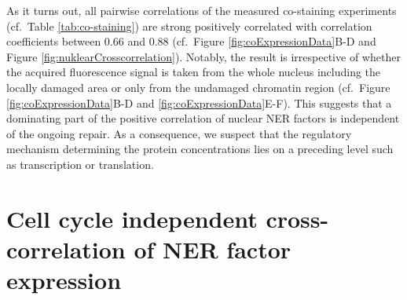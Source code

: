 \noindent As it turns out, all pairwise correlations of the measured co-staining experiments (cf.\ Table \ref{tab:co-staining}) are strong positively correlated with correlation coefficients between 0.66 and 0.88 (cf.\ Figure \ref{fig:coExpressionData}B-D and Figure \ref{fig:nuklearCrosscorrelation}). Notably, the result is irrespective of whether the acquired fluorescence signal is taken from the whole nucleus including the locally damaged area or only from the undamaged chromatin region (cf.\ Figure \ref{fig:coExpressionData}B-D and \ref{fig:coExpressionData}E-F). This suggests that a dominating part of the positive correlation of nuclear NER factors is independent of the ongoing repair. As a consequence, we suspect that the regulatory mechanism determining the protein concentrations lies on a preceding level such as transcription or translation.\\  



\section {Cell cycle independent cross-correlation of NER factor expression}

